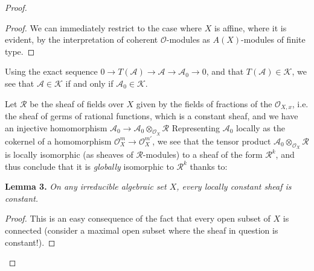 \documentclass{article}
\newenvironment{itenv}[1]
  {\smallskip\noindent\textbf{#1.}\itshape}
  {\smallskip}
\newcommand{\scr}[1]{{\mathscr{#1}}}
\renewcommand{\cal}[1]{{\mathcal{#1}}}
\begin{document}
\begin{proof}
  \begin{proof}
    We can immediately restrict to the case where $X$ is affine, where it is evident, by the interpretation of coherent $\scr{O}$-modules as $A(X)$-modules of finite type.
  \end{proof}

  Using the exact sequence $0\to T(\scr{A})\to \scr{A}\to \scr{A}_0\to 0$, and that $T(\scr{A})\in\cal{K}$, we see that $\scr{A}\in\cal{K}$ if and only if $\scr{A}_0\in\cal{K}$.

  Let $\scr{R}$ be the sheaf of fields over $X$ given by the fields of fractions of the $\scr{O}_{X,x}$, i.e. the sheaf of germs of rational functions, which is a constant sheaf, and we have an injective homomorphism $\scr{A}_0\to\scr{A}_0\otimes_{\scr{O}_X}\scr{R}$
  Representing $\scr{A}_0$ locally as the cokernel of a homomorphism $\scr{O}_X^m\to\scr{O}_X^{m'}$, we see that the tensor product $\scr{A}_0\otimes_{\scr{O}_X}\scr{R}$ is locally isomorphic (as sheaves of $\scr{R}$-modules) to a sheaf of the form $\scr{R}^k$, and thus conclude that it is \emph{globally} isomorphic to $\scr{R}^k$ thanks to:

  \begin{itenv}{Lemma 3}
  \label{lemma3}
    On any irreducible algebraic set $X$, every locally constant sheaf is constant.
  \end{itenv}

  \begin{proof}
    This is an easy consequence of the fact that every open subset of $X$ is connected (consider a maximal open subset where the sheaf in question is constant!).
  \end{proof}


\end{proof}
\end{document}
